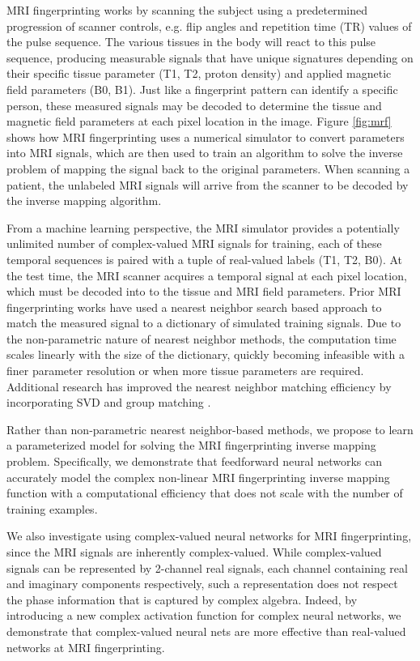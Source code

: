 \documentclass{article}
\begin{document}
MRI fingerprinting works by scanning the subject using a predetermined progression of scanner controls, e.g. flip angles and repetition time (TR) values of the pulse sequence. The various tissues in the body will react to this pulse sequence, producing measurable signals that have unique signatures depending on their specific tissue parameter (T1, T2, proton density) and applied magnetic field parameters (B0, B1). Just like a fingerprint pattern can identify a specific person, these measured signals may be decoded to determine the tissue and magnetic field parameters at each pixel location in the image. Figure \ref{fig:mrf} shows how MRI fingerprinting uses a numerical simulator to convert parameters into MRI signals, which are then used to train an algorithm to solve the inverse problem of mapping the signal back to the original parameters. When scanning a patient, the unlabeled MRI signals will arrive from the scanner to be decoded by the inverse mapping algorithm.

From a machine learning perspective, the MRI simulator provides a potentially unlimited number of complex-valued MRI signals for training, each of these temporal sequences is paired with a tuple of real-valued labels (T1, T2, B0).  At the test time, the MRI scanner acquires a temporal signal at each pixel location, which must be decoded into to the tissue and MRI field parameters. Prior MRI fingerprinting works \cite{mrf_nature,mrf_multiscale,mrf_pssfp} have used a nearest neighbor search based approach to match the measured signal to a dictionary of simulated training signals. Due to the non-parametric nature of nearest neighbor methods, the computation time scales linearly with the size of the dictionary, quickly becoming infeasible with a finer parameter resolution or when more tissue parameters are required. Additional research has improved the nearest neighbor matching efficiency by incorporating SVD \cite{mrf_svd} and group matching \cite{mrf_groupmatching}.

Rather than non-parametric nearest neighbor-based methods, we propose to learn a parameterized model for solving the MRI fingerprinting inverse mapping problem. Specifically, we demonstrate that feedforward neural networks can accurately model the complex non-linear MRI fingerprinting inverse mapping function with a computational efficiency that does not scale with the number of training examples. 

We also investigate using complex-valued neural networks for MRI fingerprinting, since the MRI signals are inherently complex-valued. While complex-valued signals can be represented by 2-channel real signals, each channel containing real and imaginary components respectively, such a representation does not respect the phase information that is captured by complex algebra. 
Indeed, by introducing a new complex activation function for complex neural networks, we demonstrate that complex-valued neural nets are more effective than real-valued networks at MRI fingerprinting.
\end{document}
